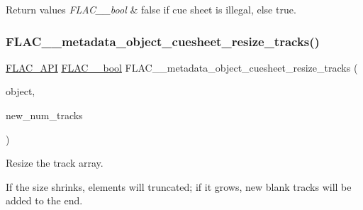 \begin{DoxyRetVals}{Return values}
{\em F\+L\+A\+C\+\_\+\+\_\+bool} & {\ttfamily false} if cue sheet is illegal, else {\ttfamily true}. \\
\hline
\end{DoxyRetVals}
\mbox{\label{group__flac__metadata__object_gafb0e09fdcfb08c466ceb1f6bca961177}} 
\subsubsection{\texorpdfstring{FLAC\_\_metadata\_object\_cuesheet\_resize\_tracks()}{FLAC\_\_metadata\_object\_cuesheet\_resize\_tracks()}}
{\footnotesize\ttfamily \mbox{\hyperlink{group__flac__export_ga56ca07df8a23310707732b1c0007d6f5}{F\+L\+A\+C\+\_\+\+A\+PI}} \mbox{\hyperlink{ordinals_8h_a95103469f1cbd78b8cf250194985b34e}{F\+L\+A\+C\+\_\+\+\_\+bool}} F\+L\+A\+C\+\_\+\+\_\+metadata\+\_\+object\+\_\+cuesheet\+\_\+resize\+\_\+tracks (\begin{DoxyParamCaption}\item[{\mbox{\hyperlink{struct_f_l_a_c_____stream_metadata}{F\+L\+A\+C\+\_\+\+\_\+\+Stream\+Metadata}} $\ast$}]{object,  }\item[{unsigned}]{new\+\_\+num\+\_\+tracks }\end{DoxyParamCaption})}

Resize the track array.

If the size shrinks, elements will truncated; if it grows, new blank tracks will be added to the end.



